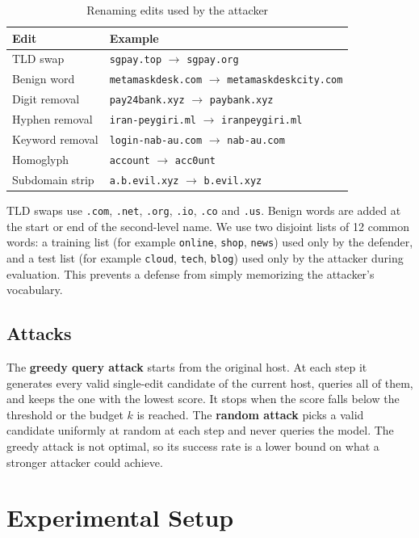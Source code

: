 \documentclass[conference]{IEEEtran}
\begin{document}
\begin{table}[t]
\centering
\caption{Renaming edits used by the attacker}
\label{tab:edits}
\footnotesize
\setlength{\tabcolsep}{3pt}
\begin{tabular}{@{}ll@{}}
\toprule
Edit & Example \\
\midrule
TLD swap & \texttt{sgpay.top} $\rightarrow$ \texttt{sgpay.org} \\
Benign word & \texttt{metamaskdesk.com} $\rightarrow$ \texttt{metamaskdeskcity.com} \\
Digit removal & \texttt{pay24bank.xyz} $\rightarrow$ \texttt{paybank.xyz} \\
Hyphen removal & \texttt{iran-peygiri.ml} $\rightarrow$ \texttt{iranpeygiri.ml} \\
Keyword removal & \texttt{login-nab-au.com} $\rightarrow$ \texttt{nab-au.com} \\
Homoglyph & \texttt{account} $\rightarrow$ \texttt{acc0unt} \\
Subdomain strip & \texttt{a.b.evil.xyz} $\rightarrow$ \texttt{b.evil.xyz} \\
\bottomrule
\end{tabular}
\end{table}

TLD swaps use \texttt{.com}, \texttt{.net}, \texttt{.org}, \texttt{.io}, \texttt{.co} and \texttt{.us}. Benign words are added at the start or end of the second-level name. We use two disjoint lists of 12 common words: a training list (for example \texttt{online}, \texttt{shop}, \texttt{news}) used only by the defender, and a test list (for example \texttt{cloud}, \texttt{tech}, \texttt{blog}) used only by the attacker during evaluation. This prevents a defense from simply memorizing the attacker's vocabulary.

\subsection{Attacks}
The \textbf{greedy query attack} starts from the original host. At each step it generates every valid single-edit candidate of the current host, queries all of them, and keeps the one with the lowest score. It stops when the score falls below the threshold or the budget $k$ is reached. The \textbf{random attack} picks a valid candidate uniformly at random at each step and never queries the model. The greedy attack is not optimal, so its success rate is a lower bound on what a stronger attacker could achieve.

\section{Experimental Setup}
\end{document}
